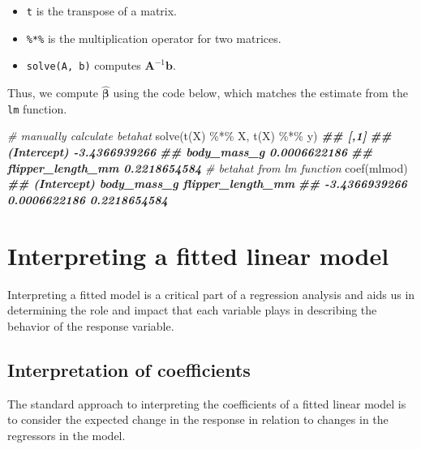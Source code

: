 \documentclass[
]{book}
\newenvironment{Shaded}{\begin{snugshade}}{\end{snugshade}}
\newcommand{\CommentTok}[1]{\textcolor[rgb]{0.56,0.35,0.01}{\textit{#1}}}
\newcommand{\DocumentationTok}[1]{\textcolor[rgb]{0.56,0.35,0.01}{\textbf{\textit{#1}}}}
\newcommand{\FunctionTok}[1]{\textcolor[rgb]{0.00,0.00,0.00}{#1}}
\newcommand{\NormalTok}[1]{#1}
\newcommand{\SpecialCharTok}[1]{\textcolor[rgb]{0.00,0.00,0.00}{#1}}
\providecommand{\tightlist}{%
  \setlength{\itemsep}{0pt}\setlength{\parskip}{0pt}}
\theoremstyle{definition}
\theoremstyle{definition}
\theoremstyle{definition}
\theoremstyle{definition}
\theoremstyle{remark}
\begin{document}
\begin{itemize}
\tightlist
\item
  \texttt{t} is the transpose of a matrix.
\item
  \texttt{\%*\%} is the multiplication operator for two matrices.
\item
  \texttt{solve(A,\ b)} computes \(\mathbf{A}^{-1}\mathbf{b}\).
\end{itemize}

Thus, we compute \(\hat{\boldsymbol{\beta}}\) using the code below, which matches the estimate from the \texttt{lm} function.

\begin{Shaded}
\begin{Highlighting}[]
\CommentTok{\# manually calculate betahat}
\FunctionTok{solve}\NormalTok{(}\FunctionTok{t}\NormalTok{(X) }\SpecialCharTok{\%*\%}\NormalTok{ X, }\FunctionTok{t}\NormalTok{(X) }\SpecialCharTok{\%*\%}\NormalTok{ y)}
\DocumentationTok{\#\#                            [,1]}
\DocumentationTok{\#\# (Intercept)       {-}3.4366939266}
\DocumentationTok{\#\# body\_mass\_g        0.0006622186}
\DocumentationTok{\#\# flipper\_length\_mm  0.2218654584}
\CommentTok{\# betahat from lm function}
\FunctionTok{coef}\NormalTok{(mlmod)}
\DocumentationTok{\#\#       (Intercept)       body\_mass\_g flipper\_length\_mm }
\DocumentationTok{\#\#     {-}3.4366939266      0.0006622186      0.2218654584}
\end{Highlighting}
\end{Shaded}

\hypertarget{interp-chapter}{%
\chapter{Interpreting a fitted linear model}\label{interp-chapter}}

Interpreting a fitted model is a critical part of a regression analysis
and aids us in determining the role and impact that each variable plays
in describing the behavior of the response variable.

\hypertarget{interpretation-of-coefficients}{%
\section{Interpretation of coefficients}\label{interpretation-of-coefficients}}

The standard approach to interpreting the coefficients of a fitted
linear model is to consider the expected change in the response in
relation to changes in the regressors in the model.
\end{document}
